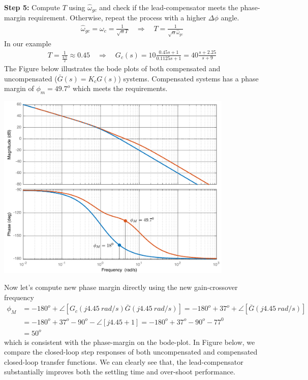 \documentclass[twoside]{article}
\begin{document}
\textbf{Step 5:} Compute $T$ using $\hat{\omega}_{gc}$ and 
check if the lead-compensator meets the phase-margin
requirement. Otherwise, repeat the process with a higher
$\Delta \phi$ angle.
%
\begin{align*}
  \hat{\omega}_{gc} = \omega_c = \frac{1}{\sqrt{\alpha} T}
                      \quad \Rightarrow \quad 
  T = \frac{1}{\sqrt{\alpha} \hat{\omega}_{gc}}
\end{align*}
%
In our example 
%
\begin{align*}
     T = \frac{1}{\frac{4.5}{2}} \approx 0.45
         \quad \Rightarrow \quad
   G_c(s) = 10 \frac{0.45 s + 1}{0.1125 s + 1} = 40 \frac{s + 2.25}{s + 9}
\end{align*}
%
The Figure below illustrates the bode plots of both 
compensated and uncompensated ($\bar{G}(s) = K_c G(s)$) systems.
Compensated systems has a phase margin of $\phi_m = 49.7^o$
which meets the requirements.
%
     \begin{center}
 \begin{minipage}[h]{\linewidth}
     \begin{center}
       \includegraphics[width=0.85\textwidth]{comparison}
     \end{center}
 \end{minipage}
     \end{center}
%
Now let's compute new phase margin directly using the 
new gain-crossover frequency  
%
\begin{align*}
	\phi_{M} &= -180^o + \angle [ G_c(j 4.45 \ rad/s) \bar{G}( j 4.45 \ rad/s) ]
		= -180^o + 37^o + \angle [ \bar{G} ( j 4.45 \ rad/s) ]
		\\
		&= -180^o + 37^o - 90^o - \angle [ j 4.45 + 1 ]	
	= -180^o + 37^o - 90^o - 77^0
		\\
		&= 50^o 
\end{align*}
%
which is consistent with the phase-margin on the bode-plot.
In Figure below, we compare the closed-loop step responses
of both uncompensated and compensated closed-loop
transfer functions. We can clearly see that, the lead-compensator
substantially improves both the settling time 
and over-shoot performance. 
\end{document}
